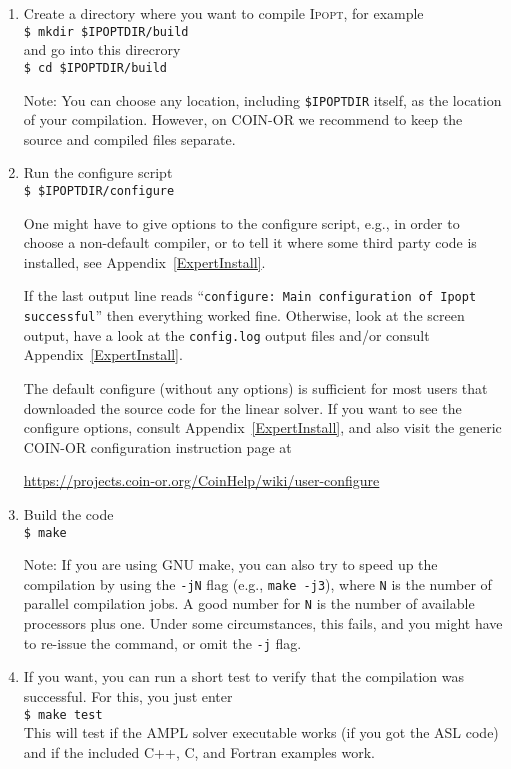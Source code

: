 \documentclass[10pt]{article}
\newcommand{\Ipopt}{\textsc{Ipopt}\xspace}
\begin{document}
\begin{enumerate}
\item Create a directory where you want to compile \Ipopt, for example\\
  {\tt \$ mkdir \$IPOPTDIR/build}\\
  and go into this direcrory\\
  {\tt \$ cd \$IPOPTDIR/build}

  Note: You can choose any location, including {\tt \$IPOPTDIR}
  itself, as the location of your compilation.  However, on COIN-OR we
  recommend to keep the source and compiled files separate.

\item Run the configure script\\
  {\tt \$ \$IPOPTDIR/configure}

  One might have to give options to the configure script, e.g., in
  order to choose a non-default compiler, or to tell it where some
  third party code is installed, see Appendix~\ref{ExpertInstall}.

  If the last output line reads ``\texttt{configure:\ Main configuration of Ipopt successful}'' then everything worked
  fine.  Otherwise, look at the screen output, have a look at the
  \texttt{config.log} output files and/or consult
  Appendix~\ref{ExpertInstall}.

  The default configure (without any options) is sufficient for most
  users that downloaded the source code for the linear solver. If you
  want to see the configure options, consult
  Appendix~\ref{ExpertInstall}, and also visit the generic COIN-OR
  configuration instruction page at

  \centerline{\url{https://projects.coin-or.org/CoinHelp/wiki/user-configure}}

\item Build the code \\
  {\tt \$ make}

  Note: If you are using GNU make, you can also try to speed up the
  compilation by using the {\tt -jN} flag (e.g., {\tt make -j3}),
  where {\tt N} is the number of parallel compilation jobs.  A good
  number for {\tt N} is the number of available processors plus one.
  Under some circumstances, this fails, and you might have to re-issue
  the command, or omit the {\tt -j} flag.
\item If you want, you can run a short test to verify that the
  compilation was successful.  For this, you just
  enter\\
  {\tt \$ make test}\\
  This will test if the AMPL solver executable works (if you got the
  ASL code) and if the included C++, C, and Fortran examples work.


\end{enumerate}
\end{document}
